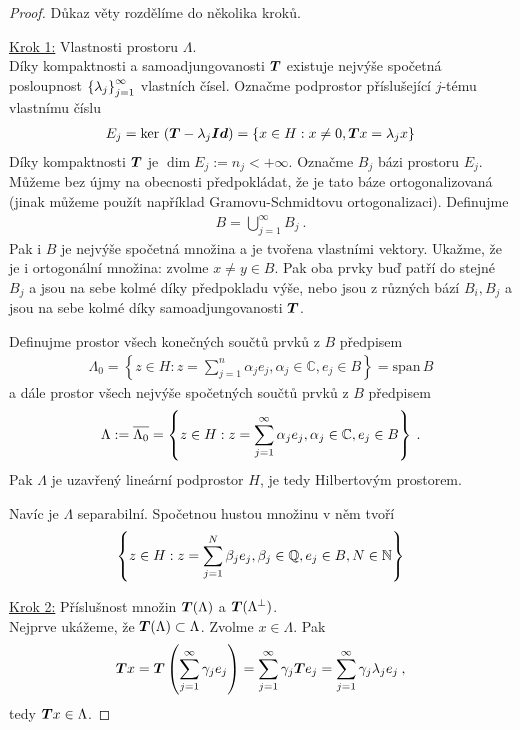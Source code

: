 \begin{proof}
Důkaz věty rozdělíme do několika kroků.

\underline{Krok 1:} Vlastnosti prostoru $\Lambda$. \\
Díky kompaktnosti a samoadjungovanosti $\boldsymbol{T}$ existuje nejvýše spočetná posloupnost $\left \lbrace \lambda_j \right \rbrace_{j=1}^\infty$ vlastních čísel. Označme podprostor příslušející $j$-tému vlastnímu číslu \begin{align*}
    E_j = \mathrm{ker}\, \left( \boldsymbol{T} - \lambda_j \boldsymbol{Id} \right) = \lbrace x \in H : x \neq 0, \boldsymbol{T} x = \lambda_j x \rbrace
\end{align*}
Díky kompaktnosti $\boldsymbol{T}$ je $\dim E_j := n_j < + \infty$. Označme $B_j$ bázi prostoru $E_j$. Můžeme bez újmy na obecnosti předpokládat, že je tato báze ortogonalizovaná (jinak můžeme použít například Gramovu-Schmidtovu ortogonalizaci). Definujme \begin{align*}
    B = \bigcup_{j=1}^\infty B_j \:.
\end{align*}
Pak i $B$ je nejvýše spočetná množina a je tvořena vlastními vektory. Ukažme, že je i ortogonální množina: zvolme $x \neq y \in B$. Pak oba prvky buď patří do stejné $B_j$ a jsou na sebe kolmé díky předpokladu výše, nebo jsou z různých bází $B_i, B_j$ a jsou na sebe kolmé díky samoadjungovanosti $\boldsymbol{T}$.

Definujme prostor všech konečných součtů prvků z $B$ předpisem \begin{align*}
    \Lambda_0 = \left\lbrace z \in H: z = \sum_{j=1}^n \alpha_j e_j, \alpha_j \in \mathbb{C} , e_j \in B \right\rbrace =  \mathrm{span}\, B
\end{align*}
a dále prostor všech nejvýše spočetných součtů prvků z $B$ předpisem \begin{align*}
    \Lambda := \overline{\Lambda_0} = \left\lbrace z \in H: z = \sum_{j=1}^\infty \alpha_j e_j, \alpha_j \in \mathbb{C} , e_j \in B \right\rbrace \:.
\end{align*}
Pak $\Lambda$ je uzavřený lineární podprostor $H$, je tedy Hilbertovým prostorem. 

Navíc je $\Lambda$ separabilní. Spočetnou hustou množinu v něm tvoří \begin{align*}
    \left\lbrace z \in H: z = \sum_{j=1}^N \beta_j e_j, \beta_j \in \mathbb{Q} , e_j \in B, N \in \mathbb{N} \right\rbrace
\end{align*}

\underline{Krok 2:} Příslušnost množin $\boldsymbol{T}(\Lambda)$ a $\boldsymbol{T}(\Lambda^\bot)$. \\
Nejprve ukážeme, že $\boldsymbol{T}(\Lambda) \subset \Lambda$. Zvolme $x \in \Lambda$. Pak \begin{align*}
    \boldsymbol{T} x = \boldsymbol{T} \left(\sum_{j=1}^\infty \gamma_j e_j \right) = \sum_{j=1}^\infty \gamma_j \boldsymbol{T} e_j = \sum_{j=1}^\infty \gamma_j \lambda_j e_j \:,
\end{align*}
tedy $\boldsymbol{T} x \in \Lambda$. 


\end{proof}
